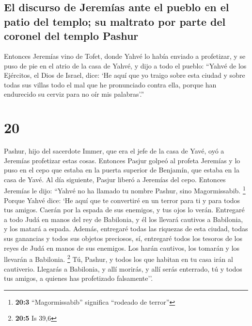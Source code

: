 \hypertarget{el-discurso-de-jeremuxedas-ante-el-pueblo-en-el-patio-del-templo-su-maltrato-por-parte-del-coronel-del-templo-pashur}{%
\subsection{El discurso de Jeremías ante el pueblo en el patio del
templo; su maltrato por parte del coronel del templo
Pashur}\label{el-discurso-de-jeremuxedas-ante-el-pueblo-en-el-patio-del-templo-su-maltrato-por-parte-del-coronel-del-templo-pashur}}

 Entonces Jeremías vino de Tofet, donde Yahvé lo había
enviado a profetizar, y se puso de pie en el atrio de la casa de Yahvé,
y dijo a todo el pueblo:  ``Yahvé de los Ejércitos, el
Dios de Israel, dice: `He aquí que yo traigo sobre esta ciudad y sobre
todas sus villas todo el mal que he pronunciado contra ella, porque han
endurecido su cerviz para no oír mis palabras'.''

\hypertarget{section-19}{%
\section{20}\label{section-19}}

 Pashur, hijo del sacerdote Immer, que era el jefe de la
casa de Yavé, oyó a Jeremías profetizar estas cosas. 
Entonces Pasjur golpeó al profeta Jeremías y lo puso en el cepo que
estaba en la puerta superior de Benjamín, que estaba en la casa de Yavé.
 Al día siguiente, Pasjur liberó a Jeremías del cepo.
Entonces Jeremías le dijo: ``Yahvé no ha llamado tu nombre Pashur, sino
Magormissabib. \footnote{\textbf{20:3} ``Magormissabib'' significa
  ``rodeado de terror''}  Porque Yahvé dice: `He aquí que
te convertiré en un terror para ti y para todos tus amigos. Caerán por
la espada de sus enemigos, y tus ojos lo verán. Entregaré a todo Judá en
manos del rey de Babilonia, y él los llevará cautivos a Babilonia, y los
matará a espada.  Además, entregaré todas las riquezas de
esta ciudad, todas sus ganancias y todos sus objetos preciosos, sí,
entregaré todos los tesoros de los reyes de Judá en manos de sus
enemigos. Los harán cautivos, los tomarán y los llevarán a Babilonia.
\footnote{\textbf{20:5} Is 39,6}  Tú, Pashur, y todos los
que habitan en tu casa irán al cautiverio. Llegarás a Babilonia, y allí
morirás, y allí serás enterrado, tú y todos tus amigos, a quienes has
profetizado falsamente''.

